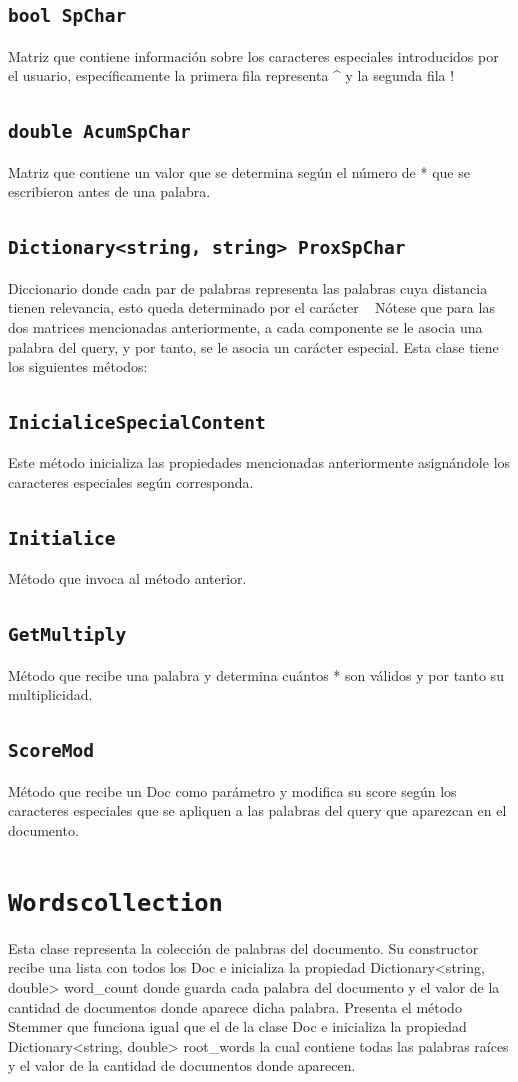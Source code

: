 \documentclass{report}
\newcommand{\csharpproperty}[1]{\textcolor{csharp-property}{\texttt{#1}}}
\begin{document}
\subsection{\csharpproperty{bool SpChar}} Matriz que contiene información sobre los caracteres especiales introducidos por el 
usuario, específicamente la primera fila representa \^{} y la segunda fila ! 
\subsection{\csharpproperty{double AcumSpChar}}  Matriz que contiene un valor que se determina según el número de * que se 
escribieron antes de una palabra.
\subsection{\csharpproperty{Dictionary<string, string> ProxSpChar}}  Diccionario donde cada par de palabras representa las palabras 
cuya distancia tienen relevancia, esto queda determinado por el carácter ~
Nótese que para las dos matrices mencionadas anteriormente, a cada componente se le asocia una 
palabra del query, y por tanto, se le asocia un carácter especial.
Esta clase tiene los siguientes métodos:
\subsection{\csharpproperty{InicialiceSpecialContent}} Este método inicializa las propiedades mencionadas anteriormente 
asignándole los caracteres especiales según corresponda.
\subsection{\csharpproperty{Initialice}} Método que invoca al método anterior.
\subsection{\csharpproperty{GetMultiply}} Método que recibe una palabra y determina cuántos * son válidos y por tanto su 
multiplicidad.
\subsection{\csharpproperty{ScoreMod}} Método que recibe un Doc como parámetro y modifica su score según los caracteres 
especiales que se apliquen a las palabras del query que aparezcan en el documento.
\section{\LARGE\csharpproperty{Wordscollection}}
Esta clase representa la colección de palabras del documento. Su constructor recibe una lista con todos 
los Doc e inicializa la propiedad Dictionary<string, double> word\_{}count donde guarda cada palabra del
documento y el valor de la cantidad de documentos donde aparece dicha palabra.
Presenta el método Stemmer que funciona igual que el de la clase Doc e inicializa la propiedad 
Dictionary<string, double> root\_{}words la cual contiene todas las palabras raíces y el valor de la cantidad 
de documentos donde aparecen.
\end{document}
